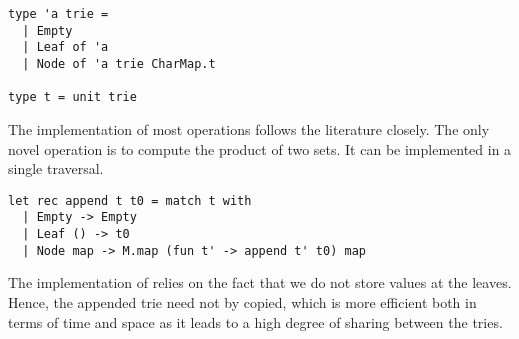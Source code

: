 \begin{lstlisting}
type 'a trie =
  | Empty
  | Leaf of 'a
  | Node of 'a trie CharMap.t

type t = unit trie
\end{lstlisting}

The implementation of most operations follows the literature
closely. The only novel operation is  to compute the product of two sets. It can be
implemented in a single traversal.

\begin{lstlisting}
let rec append t t0 = match t with
  | Empty -> Empty
  | Leaf () -> t0
  | Node map -> M.map (fun t' -> append t' t0) map
\end{lstlisting}

The implementation of  relies on the fact that we do not store
values at the leaves. Hence, the appended trie  need not by
copied, which is more efficient both in terms of time and space as it leads to a high degree of sharing between the tries.

